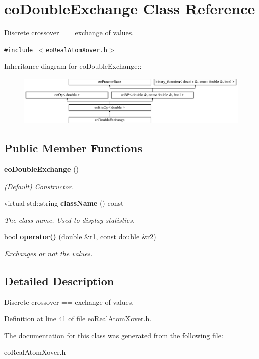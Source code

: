 \section{eo\-Double\-Exchange Class Reference}
\label{classeo_double_exchange}
Discrete crossover == exchange of values.  


{\tt \#include $<$eo\-Real\-Atom\-Xover.h$>$}

Inheritance diagram for eo\-Double\-Exchange::\begin{figure}[H]
\begin{center}
\leavevmode
\includegraphics[height=2.38552cm]{classeo_double_exchange}
\end{center}
\end{figure}
\subsection*{Public Member Functions}
\begin{CompactItemize}
\item 
{\bf eo\-Double\-Exchange} ()\label{classeo_double_exchange_a0}

\begin{CompactList}\small\item\em (Default) Constructor. \item\end{CompactList}\item 
virtual std::string {\bf class\-Name} () const \label{classeo_double_exchange_a1}

\begin{CompactList}\small\item\em The class name. Used to display statistics. \item\end{CompactList}\item 
bool {\bf operator()} (double \&r1, const double \&r2)\label{classeo_double_exchange_a2}

\begin{CompactList}\small\item\em Exchanges or not the values. \item\end{CompactList}\end{CompactItemize}


\subsection{Detailed Description}
Discrete crossover == exchange of values. 



Definition at line 41 of file eo\-Real\-Atom\-Xover.h.

The documentation for this class was generated from the following file:\begin{CompactItemize}
\item 
eo\-Real\-Atom\-Xover.h\end{CompactItemize}
